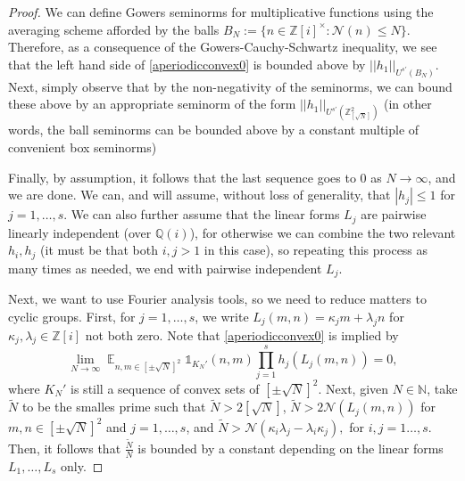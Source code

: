 \documentclass[11pt]{amsart}
\theoremstyle{definition}
\DeclareMathOperator*{\E}{\mathbb{E}}
\newcommand{\N}{{\mathbb N}}
\newcommand{\NN}{{\mathcal N}}
\newcommand{\Q}{{\mathbb Q}}
\newcommand{\Z}{{\mathbb Z}}
\begin{document}
\begin{proof}
We can define Gowers seminorms for multiplicative functions using the averaging scheme afforded by the balls $B_N:=\{ n  \in \Z[i]^{\times} : \NN(n) \leq N\}$. Therefore, as a consequence of the Gowers-Cauchy-Schwartz inequality, we see that the left hand side of \eqref{aperiodicconvex0} is bounded above by $||h_1||_{U^{s'}(B_N)}$. Next, simply observe that by the non-negativity of the seminorms, we can bound these above by an appropriate seminorm of the form $||h_1||_{U^{s'}(\Z^2_{[\sqrt{N}]})}$ (in other words, the ball seminorms can be bounded above by a constant multiple of convenient box seminorms) 

Finally, by assumption, it follows that the last sequence goes to $0$ as $N \to \infty$, and we are done.
\iffalse
We can, and will assume, without loss of generality, that $|h_j| \leq 1$ for $j=1,\dots, s$. We can also further assume that the linear forms $L_j$ are pairwise linearly independent (over $\Q(i)$), for otherwise we can combine the two relevant $h_i, h_j$ (it must be that both $i,j>1$ in this case), so repeating this process as many times as needed, we end with pairwise independent $L_j$.

Next, we want to use Fourier analysis tools, so we need to reduce matters to cyclic groups. First, for $j=1,\dots, s$, we write $L_j(m,n)=\kappa_jm+\lambda_jn$ for $\kappa_j,\lambda_j \in \Z[i]$ not both zero. Note that \eqref{aperiodicconvex0} is implied by
\begin{equation}
\lim_{N \to \infty} \E_{n, m \in [\pm \sqrt{N}]^2} \mathds{1}_{K_N'}(n,m) \prod_{j=1}^s h_j(L_j(m,n)) = 0,
\end{equation}
where $K_N'$ is still a sequence of convex sets of $[\pm \sqrt{N}]^2$. Next, given $N \in \N$, take $\tilde{N}$ to be the smalles prime such that $\tilde{N}>2[\sqrt{N}]$, $\tilde{N}>2\NN(L_j(m,n))$ for $m, n \in [\pm \sqrt{N}]^2$ and $j=1,\dots, s$, and $\tilde{N}>\NN(\kappa_i\lambda_j-\lambda_i\kappa_j),$ for $i,j=1\dots, s$. Then, it follows that $\frac{\tilde{N}}{N}$ is bounded by a constant depending on the linear forms $L_1,\dots,L_s$ only.


\end{proof}
\end{document}
